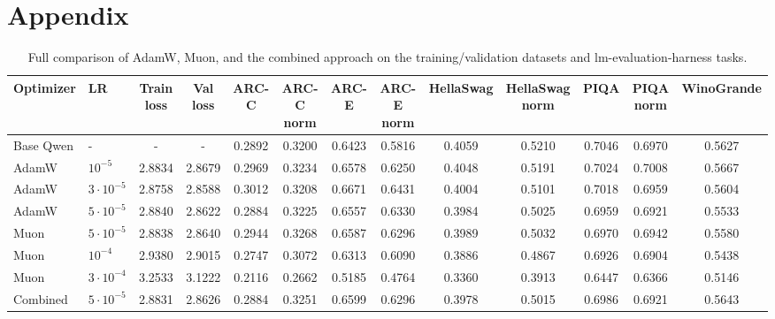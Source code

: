 \documentclass{article}
\begin{document}
\appendix

\section{Appendix}

\begin{table}
\centering
\scriptsize{%
\begin{tabular}{llccccccccccc}
\toprule
Optimizer & LR & Train loss & Val loss 
& ARC-C & ARC-C norm 
& ARC-E & ARC-E norm 
& HellaSwag & HellaSwag norm 
& PIQA & PIQA norm 
& WinoGrande \\
\midrule
Base Qwen & - & - & - & 0.2892 & 0.3200 & 0.6423 & 0.5816 & 0.4059 & 0.5210 & 0.7046 & 0.6970 & 0.5627 \\

AdamW & $10^{-5}$ & 2.8834 & 2.8679 & 0.2969 & 0.3234 & 0.6578 & 0.6250 & 0.4048 & 0.5191 & 0.7024 & 0.7008 & 0.5667 \\

AdamW & $3 \cdot 10^{-5}$ & 2.8758 & 2.8588 & 0.3012 & 0.3208 & 0.6671 & 0.6431 & 0.4004 & 0.5101 & 0.7018 & 0.6959 & 0.5604 \\

AdamW & $5 \cdot 10^{-5}$ & 2.8840 & 2.8622 & 0.2884 & 0.3225 & 0.6557 & 0.6330 & 0.3984 & 0.5025 & 0.6959 & 0.6921 & 0.5533 \\
\midrule

Muon & $5 \cdot 10^{-5}$ & 2.8838 & 2.8640 & 0.2944 & 0.3268 & 0.6587 & 0.6296 & 0.3989 & 0.5032 & 0.6970 & 0.6942 & 0.5580 \\

Muon & $10^{-4}$ & 2.9380 & 2.9015 & 0.2747 & 0.3072 & 0.6313 & 0.6090 & 0.3886 & 0.4867 & 0.6926 & 0.6904 & 0.5438 \\

Muon & $3 \cdot 10^{-4}$ & 3.2533 & 3.1222 & 0.2116 & 0.2662 & 0.5185 & 0.4764 & 0.3360 & 0.3913 & 0.6447 & 0.6366 & 0.5146 \\
\midrule

Combined & $5 \cdot 10^{-5}$ & 2.8831 & 2.8626 & 0.2884 & 0.3251 & 0.6599 & 0.6296 & 0.3978 & 0.5015 & 0.6986 & 0.6921 & 0.5643 \\
\bottomrule
\end{tabular}%
}
\caption{Full comparison of AdamW, Muon, and the combined approach on the training/validation datasets and lm-evaluation-harness tasks.}
\label{tab:optimizer-comparison-full}
\end{table}
\end{document}
